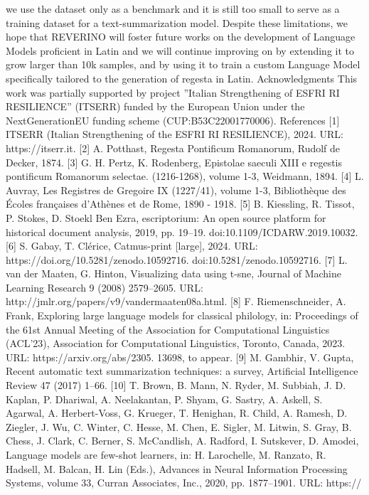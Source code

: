 {we use the dataset only as a benchmark and it is still too small to serve as a training dataset for a
text-summarization model.
Despite these limitations, we hope that REVERINO will foster future works on the development
of Language Models proficient in Latin and we will continue improving on by extending it to grow
larger than 10k samples, and by using it to train a custom Language Model specifically tailored to the
generation of regesta in Latin.
Acknowledgments
This work was partially supported by project ”Italian Strengthening of ESFRI RI RESILIENCE” (ITSERR)
funded by the European Union under the NextGenerationEU funding scheme (CUP:B53C22001770006).
References
[1] ITSERR (Italian Strengthening of the ESFRI RI RESILIENCE), 2024. URL: https://itserr.it.
[2] A. Potthast, Regesta Pontificum Romanorum, Rudolf de Decker, 1874.
[3] G. H. Pertz, K. Rodenberg, Epistolae saeculi XIII e regestis pontificum Romanorum selectae.
(1216-1268), volume 1-3, Weidmann, 1894.
[4] L. Auvray, Les Registres de Gregoire IX (1227/41), volume 1-3, Bibliothèque des Écoles françaises
d’Athènes et de Rome, 1890 - 1918.
[5] B. Kiessling, R. Tissot, P. Stokes, D. Stoekl Ben Ezra, escriptorium: An open source platform for
historical document analysis, 2019, pp. 19–19. doi:10.1109/ICDARW.2019.10032.
[6] S. Gabay, T. Clérice, Catmus-print [large], 2024. URL: https://doi.org/10.5281/zenodo.10592716.
doi:10.5281/zenodo.10592716.
[7] L. van der Maaten, G. Hinton, Visualizing data using t-sne, Journal of Machine Learning Research
9 (2008) 2579–2605. URL: http://jmlr.org/papers/v9/vandermaaten08a.html.
[8] F. Riemenschneider, A. Frank, Exploring large language models for classical philology, in:
Proceedings of the 61st Annual Meeting of the Association for Computational Linguistics (ACL’23),
Association for Computational Linguistics, Toronto, Canada, 2023. URL: https://arxiv.org/abs/2305.
13698, to appear.
[9] M. Gambhir, V. Gupta, Recent automatic text summarization techniques: a survey, Artificial
Intelligence Review 47 (2017) 1–66.
[10] T. Brown, B. Mann, N. Ryder, M. Subbiah, J. D. Kaplan, P. Dhariwal, A. Neelakantan, P. Shyam,
G. Sastry, A. Askell, S. Agarwal, A. Herbert-Voss, G. Krueger, T. Henighan, R. Child, A. Ramesh,
D. Ziegler, J. Wu, C. Winter, C. Hesse, M. Chen, E. Sigler, M. Litwin, S. Gray, B. Chess, J. Clark,
C. Berner, S. McCandlish, A. Radford, I. Sutskever, D. Amodei, Language models are few-shot learners, in: H. Larochelle, M. Ranzato, R. Hadsell, M. Balcan, H. Lin (Eds.), Advances in Neural Information Processing Systems, volume 33, Curran Associates, Inc., 2020, pp. 1877–1901. URL: https://
}
